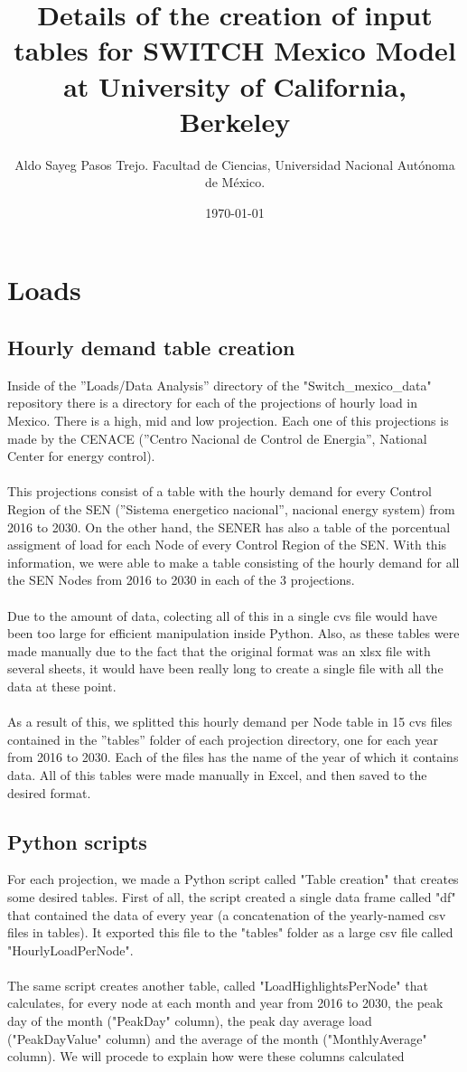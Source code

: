 \documentclass{article}
\author{Aldo Sayeg Pasos Trejo. Facultad de Ciencias, Universidad Nacional Autónoma de México.}
\date{\today}
\title{Details of the creation of input tables for SWITCH Mexico Model at University of California, Berkeley}
\begin{document}
\maketitle
\section{Loads}
\subsection{Hourly demand table creation}
Inside of the ''Loads/Data Analysis'' directory of the "Switch\_mexico\_data" repository there is a directory for each of the projections of hourly load in Mexico. There is a high, mid and low projection. Each one of this projections is made by the CENACE (''Centro Nacional de Control de Energia'', National Center for energy control). 
\\
\\This projections consist of a table with the hourly demand for every Control Region of the SEN (''Sistema energetico nacional'', nacional energy system) from 2016 to 2030. On the other hand, the SENER has also a table of the porcentual assigment of load for each Node of every Control Region of the SEN. With this information, we were able to make a table consisting of the hourly demand for all the SEN Nodes from 2016 to 2030 in each of the 3 projections. 
\\
\\Due to the amount of data, colecting all of this in a single cvs file would have been too large for efficient manipulation inside Python. Also, as these tables were made manually due to the fact that the original format was an xlsx file with several sheets, it would have been really long to create a single file with all the data at these point. 
\\
\\As a result of this, we splitted this hourly demand per Node table in 15 cvs files contained in the ''tables'' folder of each projection directory, one for each year from 2016 to 2030. Each of the files has the name of the year of which it contains data. All of this tables were made manually in Excel, and then saved to the desired format.
\subsection{Python scripts}
For each projection, we made a Python script called "Table creation" that creates some desired tables. First of all, the script created a single data frame called "df" that contained the data of every year (a concatenation of the yearly-named csv files in tables). It exported this file to the "tables" folder as a large csv file called "HourlyLoadPerNode". 
\\
\\The same script creates another table, called "LoadHighlightsPerNode" that calculates, for every node at each month and year from 2016 to 2030, the peak day of the month ("PeakDay" column), the peak day average load ("PeakDayValue" column) and the average of the month ("MonthlyAverage" column). We will procede to explain how were these columns calculated
\end{document}
